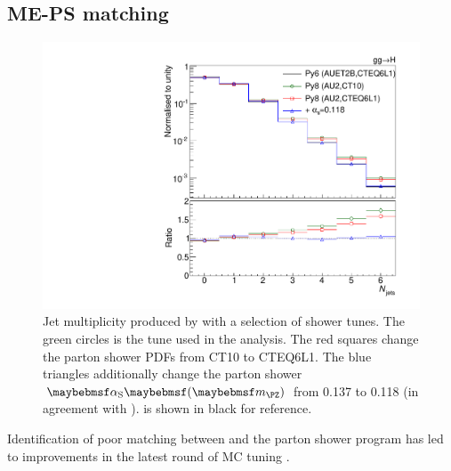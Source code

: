 \subsection{ME-PS matching}

\begin{figure}
	\includegraphics[width=\smallfigwidth]{tex/signal/matching}
	\caption{Jet multiplicity produced by  with a selection 
	of shower tunes. The green circles is the tune used in the analysis. The red squares 
	change the parton shower PDFs from CT10 to CTEQ6L1. The blue triangles additionally 
	change the parton shower $\alphaS\parenths{\mZ}$ from 0.137 to 0.118 (in agreement 
	with \powhegbox).  is shown in black for reference.}
	\label{fig:signal:matching}
\end{figure}

Identification of poor matching between \powhegbox and the  parton shower 
program has led to improvements in the latest round of MC tuning \cite{ATLAS:tune:2013}.
